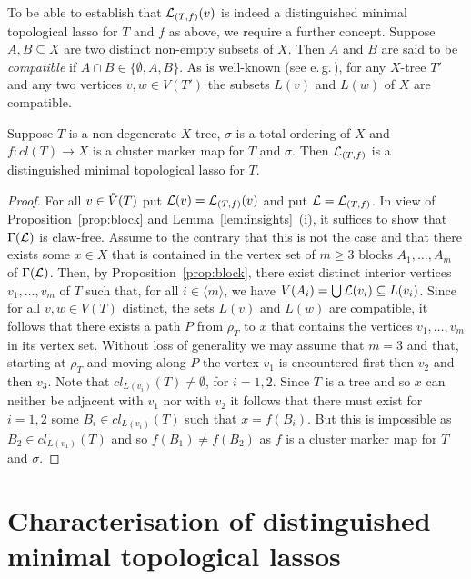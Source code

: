To be able to establish that ${\mathcal L}_{(T,f)}(v)$ is indeed a distinguished
minimal topological lasso for $T$ and $f$ as above, we require a further
concept. Suppose $A, B\subseteq X$ are two distinct non-empty subsets of
$X$. Then $A$ and $B$ are said to be {\em compatible} if $A\cap
B\in\{\emptyset, A,B\}$. As is well-known (see
e.\,g.\,\cite{DHKMS11,semple2003phylogenetics}), for any $X$-tree $T'$ and any
two vertices $v,w\in V(T')$ the subsets $L(v)$ and $L(w)$ of $X$ are
compatible.

\begin{thm}
  \label{theo: distinguished-lasso-verification}
  Suppose $T$ is a non-degenerate $X$-tree, $\sigma$ is a total ordering of
  $X$ and $f:cl(T)\to X$ is a cluster marker map for $T$ and $\sigma$. Then
  ${\mathcal L}_{(T,f)}$ is a distinguished minimal topological lasso for $T$.
\end{thm}
\begin{proof}
  For all $v\in \mathring{V}(T)$ put ${\mathcal L}(v) = {\mathcal L}_{(T,f)}(v)$ and put
  ${\mathcal L}={\mathcal L}_{(T,f)}$.  In view of Proposition~\ref{prop:block} and
  Lemma~\ref{lem:insights}~(i), it suffices to show that $\Gamma({\mathcal L})$ is
  claw-free.  Assume to the contrary that this is not the case and that there
  exists some $x\in X$ that is contained in the vertex set of $m\geq 3$ blocks
  $A_1,\ldots,A_m$ of $\Gamma({\mathcal L})$. Then, by Proposition~\ref{prop:block},
  there exist distinct interior vertices $v_1, \ldots, v_m$ of $T$ such that,
  for all $i\in\langle m\rangle$, we have $V(A_i)=\bigcup{\mathcal L}(v_i)\subseteq
  L(v_i)$.  Since for all $v,w\in V(T)$ distinct, the sets $L(v)$ and $L(w)$
  are compatible, it follows that there exists a path $P$ from $\rho_T$ to $x$
  that contains the vertices $v_1,\ldots, v_m$ in its vertex set. Without loss
  of generality we may assume that $m=3$ and that, starting at $\rho_T$ and
  moving along $P$ the vertex $v_1$ is encountered first then $v_2$ and then
  $v_3$. Note that $cl_{L(v_i)}(T)\not=\emptyset$, for $i=1,2$.  Since $T$ is
  a tree and so $x$ can neither be adjacent with $v_1$ nor with $v_2$ it
  follows that there must exist for $i=1,2$ some $B_i\in cl_{L(v_i)}(T)$ such
  that $x=f(B_i)$. But this is impossible as $B_2\in cl_{L(v_1)}(T)$ and so
  $f(B_1)\not=f(B_2)$ as $f$ is a cluster marker map for $T$ and $\sigma$.
\end{proof}

\section{Characterisation of distinguished minimal topological lassos}
\label{sec:characterization-distinguished}

